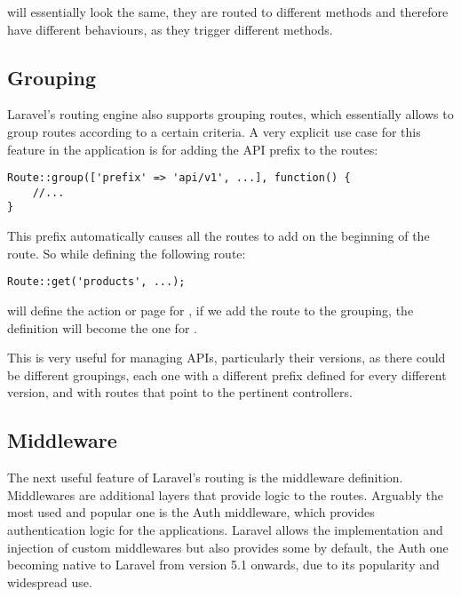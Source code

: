 will essentially look the same, they are routed to different methods and therefore have different behaviours, as they trigger different methods.

\subsection{Grouping}
Laravel’s routing engine also supports grouping routes, which essentially allows to group routes according to a certain criteria. A very explicit use case for this feature in the application is for adding the API prefix to the routes:

\begin{verbatim}
Route::group(['prefix' => 'api/v1', ...], function() {
	//...
}
\end{verbatim}

This prefix automatically causes all the routes to add  on the beginning of the route. So while defining the following route:

\begin{verbatim}
Route::get('products', ...);
\end{verbatim}

will define the action or page for , if we add the route to the grouping, the definition will become the one for .

This is very useful for managing APIs, particularly their versions, as there could be different groupings, each one with a different prefix defined for every different version, and with routes that point to the pertinent controllers.

\subsection{Middleware}
The next useful feature of Laravel’s routing is the middleware definition. Middlewares are additional layers that provide logic to the routes. Arguably the most used and popular one is the Auth middleware, which provides authentication logic for the applications. Laravel allows the implementation and injection of custom middlewares but also provides some by default, the Auth one becoming native to Laravel from version 5.1 onwards, due to its popularity and widespread use.

